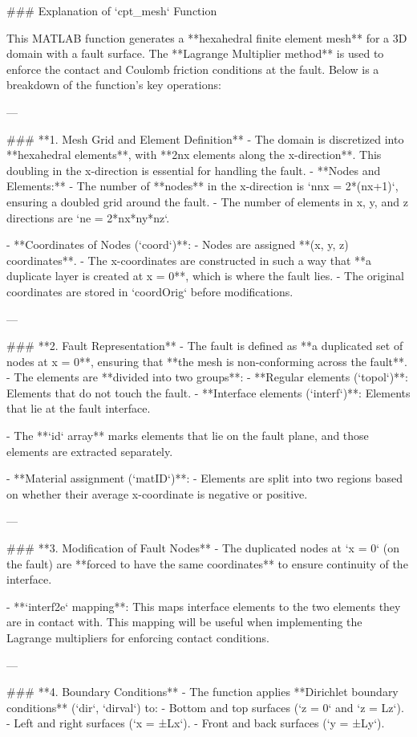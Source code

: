 ### Explanation of `cpt_mesh` Function  

This MATLAB function generates a **hexahedral finite element mesh** for a 3D domain with a fault surface. The **Lagrange Multiplier method** is used to enforce the contact and Coulomb friction conditions at the fault. Below is a breakdown of the function’s key operations:

---

### **1. Mesh Grid and Element Definition**
- The domain is discretized into **hexahedral elements**, with **2nx elements along the x-direction**. This doubling in the x-direction is essential for handling the fault.
- **Nodes and Elements:**
  - The number of **nodes** in the x-direction is `nnx = 2*(nx+1)`, ensuring a doubled grid around the fault.
  - The number of elements in x, y, and z directions are `ne = 2*nx*ny*nz`.

- **Coordinates of Nodes (`coord`)**:
  - Nodes are assigned **(x, y, z) coordinates**.
  - The x-coordinates are constructed in such a way that **a duplicate layer is created at x = 0**, which is where the fault lies.
  - The original coordinates are stored in `coordOrig` before modifications.

---

### **2. Fault Representation**
- The fault is defined as **a duplicated set of nodes at x = 0**, ensuring that **the mesh is non-conforming across the fault**.
- The elements are **divided into two groups**: 
  - **Regular elements (`topol`)**: Elements that do not touch the fault.
  - **Interface elements (`interf`)**: Elements that lie at the fault interface.

- The **`id` array** marks elements that lie on the fault plane, and those elements are extracted separately.

- **Material assignment (`matID`)**:
  - Elements are split into two regions based on whether their average x-coordinate is negative or positive.

---

### **3. Modification of Fault Nodes**
- The duplicated nodes at `x = 0` (on the fault) are **forced to have the same coordinates** to ensure continuity of the interface.

- **`interf2e` mapping**: This maps interface elements to the two elements they are in contact with. This mapping will be useful when implementing the Lagrange multipliers for enforcing contact conditions.

---

### **4. Boundary Conditions**
- The function applies **Dirichlet boundary conditions** (`dir`, `dirval`) to:
  - Bottom and top surfaces (`z = 0` and `z = Lz`).
  - Left and right surfaces (`x = ±Lx`).
  - Front and back surfaces (`y = ±Ly`).
  
